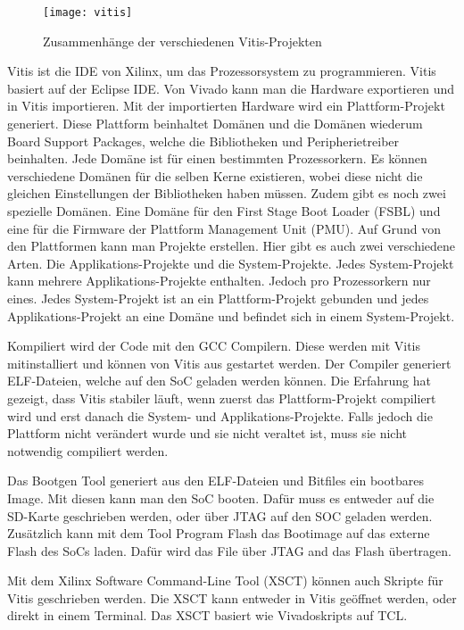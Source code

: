 \begin{figure}[tb]
    \centering
    \texttt{[image: vitis]}
    \caption{Zusammenhänge der verschiedenen Vitis-Projekten}
    \label{fig:vitis}
\end{figure}

Vitis ist die IDE von Xilinx, um das Prozessorsystem zu programmieren. Vitis basiert auf der Eclipse IDE. 
Von Vivado kann man die Hardware exportieren und in Vitis importieren. Mit der importierten Hardware wird ein Plattform-Projekt generiert. Diese Plattform beinhaltet Domänen und die Domänen wiederum Board Support Packages, welche die Bibliotheken und Peripherietreiber beinhalten. Jede Domäne ist für einen bestimmten Prozessorkern. Es können verschiedene Domänen für die selben Kerne existieren, wobei diese nicht die gleichen Einstellungen der Bibliotheken haben müssen. Zudem gibt es noch zwei spezielle Domänen. Eine Domäne für den First Stage Boot Loader (FSBL) und eine für die Firmware der Plattform Management Unit (PMU). Auf Grund von den Plattformen kann man Projekte erstellen. Hier gibt es auch zwei verschiedene Arten. Die Applikations-Projekte und die System-Projekte. Jedes System-Projekt kann mehrere Applikations-Projekte enthalten. Jedoch pro Prozessorkern nur eines. Jedes System-Projekt ist an ein Plattform-Projekt gebunden und jedes Applikations-Projekt an eine Domäne und befindet sich in einem System-Projekt.

Kompiliert wird der Code mit den GCC Compilern. Diese werden mit Vitis mitinstalliert und können von Vitis aus gestartet werden. Der Compiler generiert ELF-Dateien, welche auf den SoC geladen werden können. Die Erfahrung hat gezeigt, dass Vitis stabiler läuft, wenn zuerst das Plattform-Projekt compiliert wird und erst danach die System- und Applikations-Projekte. Falls jedoch die Plattform nicht verändert wurde und sie nicht veraltet ist, muss sie nicht notwendig compiliert werden.

Das Bootgen Tool generiert aus den ELF-Dateien und Bitfiles ein bootbares Image. Mit diesen kann man den SoC booten. Dafür muss es entweder auf die SD-Karte geschrieben werden, oder über JTAG auf den SOC geladen werden. Zusätzlich kann mit dem Tool Program Flash das Bootimage auf das externe Flash des SoCs laden. Dafür wird das File über JTAG and das Flash übertragen.

Mit dem Xilinx Software Command-Line Tool (XSCT) können auch Skripte für Vitis geschrieben werden. Die XSCT kann entweder in Vitis geöffnet werden, oder direkt in einem Terminal. Das XSCT basiert wie Vivadoskripts auf TCL.

